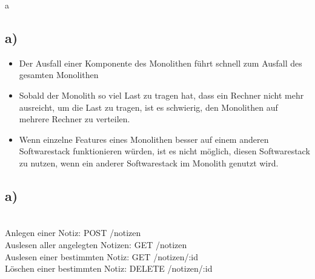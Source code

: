 \documentclass[ngerman]{fbi-aufgabenblatt}
\begin{document}
	a
	\subsection{a)}
	\begin{itemize}
		\item  Der Ausfall einer Komponente des Monolithen führt schnell zum Ausfall des gesamten Monolithen
		\item Sobald der Monolith so viel Last zu tragen hat, dass ein Rechner nicht mehr ausreicht, um die Last zu tragen, ist es schwierig, den Monolithen auf mehrere Rechner zu verteilen.
		\item Wenn einzelne Features eines Monolithen besser auf einem anderen Softwarestack funktionieren würden, ist es nicht möglich, diesen Softwarestack zu nutzen, wenn ein anderer Softwarestack im Monolith genutzt wird.
	\end{itemize}
	\subsection{a)} \\
	Anlegen einer Notiz: POST /notizen \\
	Auslesen aller angelegten Notizen: GET /notizen \\
	Auslesen einer bestimmten Notiz: GET /notizen/:id \\
	Löschen einer bestimmten Notiz: DELETE /notizen/:id
	
	
\end{document}
